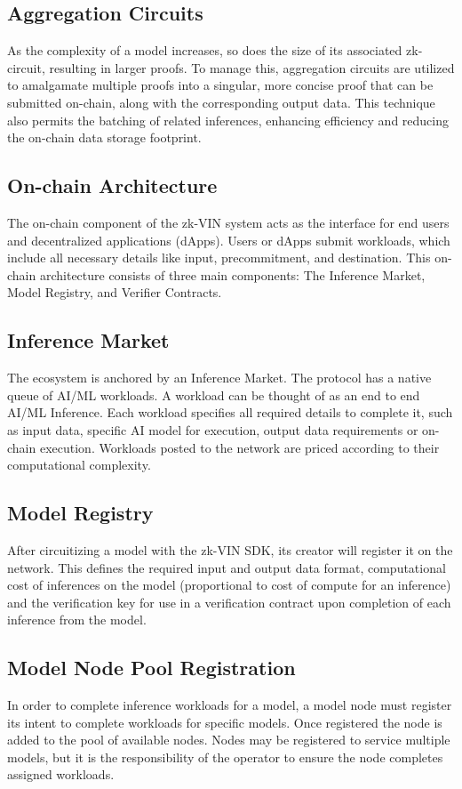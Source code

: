 \documentclass[conference]{IEEEtran}
\begin{document}
\subsection{Aggregation Circuits}
As the complexity of a model increases, so does the size of its associated zk-circuit, resulting in larger proofs. To manage this, aggregation circuits are utilized to amalgamate multiple proofs into a singular, more concise proof that can be submitted on-chain, along with the corresponding output data. This technique also permits the batching of related inferences, enhancing efficiency and reducing the on-chain data storage footprint.

\subsection{On-chain Architecture}
The on-chain component of the zk-VIN system acts as the interface for end users and decentralized applications (dApps).  Users or dApps submit workloads, which include all necessary details like input, precommitment, and destination. This on-chain architecture consists of three main components: The Inference Market, Model Registry, and Verifier Contracts.

\subsection{Inference Market}
The ecosystem is anchored by an Inference Market. The protocol has a native queue of AI/ML workloads. A workload can be thought of as an end to end AI/ML Inference. Each workload specifies all required details to complete it, such as input data, specific AI model for execution, output data requirements or on-chain execution. Workloads posted to the network are priced according to their computational complexity.

\subsection{Model Registry}
After circuitizing a model with the zk-VIN SDK, its creator will register it on the network. This defines the required input and output data format, computational cost of inferences on the model (proportional to cost of compute for an inference) and the verification key for use in a verification contract upon completion of each inference from the model.

\subsection{Model Node Pool Registration}
In order to complete inference workloads for a model, a model node must register its intent to complete workloads for specific models. Once registered the node is added to the pool of available nodes. Nodes may be registered to service multiple models, but it is the responsibility of the operator to ensure the node completes assigned workloads.
\end{document}
